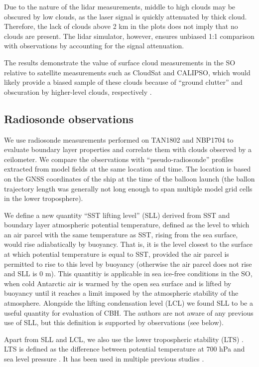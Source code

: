 Due to the nature of the lidar measurements, middle to high clouds may be
obscured by low clouds, as the laser signal is quickly attenuated by thick
cloud. Therefore, the lack of clouds above 2 \unit{km} in the plots does not
imply that no clouds are present. The lidar simulator, however, ensures
unbiased 1:1 comparison with observations by accounting for the signal
attenuation.

The results demonstrate the value of surface cloud measurements in the SO
relative to satellite measurements such as CloudSat and CALIPSO, which would
likely provide a biased sample of these clouds because of ``ground clutter''
and obscuration by higher-level clouds, respectively \citep{alexander2018}.

\subsection{Radiosonde observations}
\label{sec:radiosonde-observations}

We use radiosonde measurements performed on TAN1802 and NBP1704 to
evaluate boundary layer properties and correlate them with clouds observed by
a ceilometer. We compare the observations with ``pseudo-radiosonde'' profiles
extracted from model fields at the same location and time. The location is
based on the GNSS coordinates of the ship at the time of the balloon launch
(the ballon trajectory length was generally not long enough to span multiple
model grid cells in the lower troposphere).

We define a new quantity ``SST lifting level'' (SLL) derived
from SST and boundary layer atmospheric potential temperature,
defined as the level to which
an air parcel with the same temperature as SST, rising from the sea surface,
would rise adiabatically by buoyancy. That is, it is the level closest to the
surface at which potential temperature is equal to SST, provided the air parcel
is permitted to rise to this level by buoyancy (otherwise the air parcel does
not rise and SLL is 0 m). This quantitiy is applicable in sea ice-free
conditions in the SO, when cold Antarctic air is warmed by the open sea surface
and is lifted by buoyancy until it reaches a limit imposed by the atmospheric
stability of the atmosphere. Alongside the lifting condensation level (LCL) we
found SLL to be a useful quantity for evaluation of CBH. The
authors are not aware of any previous use of SLL, but this definition is
supported by observations (see below).

Apart from SLL and LCL, we also use the lower tropospheric stability (LTS)
\citep{klein1993}. LTS is defined as the difference between potential
temperature at 700 hPa and sea level pressure \citep{klein1993}. It has been
used in multiple previous studies
\citep{williams2006,franklin2013,williams2013,naud2014}. 

